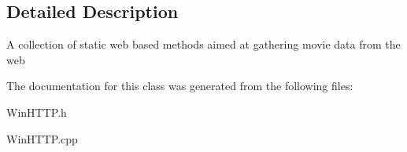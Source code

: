 \subsection{Detailed Description}
A collection of static web based methods aimed at gathering movie data from the web 

The documentation for this class was generated from the following files\+:\begin{DoxyCompactItemize}
\item 
Win\+H\+T\+T\+P.\+h\item 
Win\+H\+T\+T\+P.\+cpp\end{DoxyCompactItemize}
